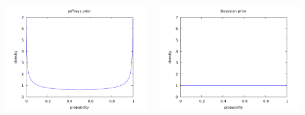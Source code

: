 \documentclass[aspectratio=169]{beamer}
\begin{document}
\begin{frame}


  \\[1.45cm]

  \begin{columns}
    \column{1.65in}
    \includegraphics[scale=0.2]{images/jeffreys_prior.png}  

    \column{1.65in}
    \includegraphics[scale=0.2]{images/bayesian_prior.png}  


\end{columns}
\end{frame}
\end{document}
